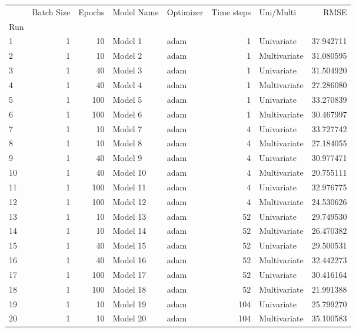 \begin{tabular}{lrrllrlr}
\toprule
 & Batch Size & Epochs & Model Name & Optimizer & Time steps & Uni/Multi & RMSE \\
Run &  &  &  &  &  &  &  \\
\midrule
1 & 1 & 10 & Model 1 & adam & 1 & Univariate & 37.942711 \\
2 & 1 & 10 & Model 2 & adam & 1 & Multivariate & 31.080595 \\
3 & 1 & 40 & Model 3 & adam & 1 & Univariate & 31.504920 \\
4 & 1 & 40 & Model 4 & adam & 1 & Multivariate & 27.286080 \\
5 & 1 & 100 & Model 5 & adam & 1 & Univariate & 33.270839 \\
6 & 1 & 100 & Model 6 & adam & 1 & Multivariate & 30.467997 \\
7 & 1 & 10 & Model 7 & adam & 4 & Univariate & 33.727742 \\
8 & 1 & 10 & Model 8 & adam & 4 & Multivariate & 27.184055 \\
9 & 1 & 40 & Model 9 & adam & 4 & Univariate & 30.977471 \\
10 & 1 & 40 & Model 10 & adam & 4 & Multivariate & 20.755111 \\
11 & 1 & 100 & Model 11 & adam & 4 & Univariate & 32.976775 \\
12 & 1 & 100 & Model 12 & adam & 4 & Multivariate & 24.530626 \\
13 & 1 & 10 & Model 13 & adam & 52 & Univariate & 29.749530 \\
14 & 1 & 10 & Model 14 & adam & 52 & Multivariate & 26.470382 \\
15 & 1 & 40 & Model 15 & adam & 52 & Univariate & 29.500531 \\
16 & 1 & 40 & Model 16 & adam & 52 & Multivariate & 32.442273 \\
17 & 1 & 100 & Model 17 & adam & 52 & Univariate & 30.416164 \\
18 & 1 & 100 & Model 18 & adam & 52 & Multivariate & 21.991388 \\
19 & 1 & 10 & Model 19 & adam & 104 & Univariate & 25.799270 \\
20 & 1 & 10 & Model 20 & adam & 104 & Multivariate & 35.100583 \\
\bottomrule
\end{tabular}
